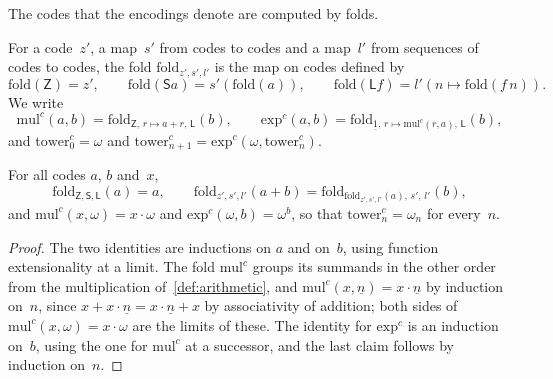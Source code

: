 \documentclass[11pt]{amsart}
\makeatletter
\newcommand{\bZ}{\mathsf{Z}}
\newcommand{\bS}{\mathsf{S}}
\newcommand{\bL}{\mathsf{L}}
\newcommand{\bplus}{\mathbin{+}}
\newcommand{\btimes}{\mathbin{\cdot}}
\newcommand{\num}[1]{\underline{#1}}          %
\newcommand{\tower}[1]{\omega_{#1}}           %
\newif\ifagdarefs
\newcommand{\AgdaRefs}[1]{\ifagdarefs{\footnotesize\color{agdablue}(#1)}\else\unskip\fi}
\newcommand{\Agda}[2]{{\footnotesize\color{agdablue}\textsf{#1}%
  \ifblank{#2}{}{\texttt{.}\allowbreak\texttt{#2}}}}
\let\ttt@plain\texttt
\renewcommand{\texttt}[1]{{\footnotesize\color{agdablue}\ttt@plain{#1}}}
\theoremstyle{plain}
\theoremstyle{definition}
\makeatother
\begin{document}
The codes that the encodings denote are computed by folds.

\begin{definition}
\label{def:fold}
For a code~$z'$, a map~$s'$ from codes to codes and a map~$l'$ from
sequences of codes to codes, the fold
$\mathrm{fold}_{z',s',l'}$ is the map on codes defined by
\[
  \mathrm{fold}(\bZ) = z' , \qquad
  \mathrm{fold}(\bS a) = s'(\mathrm{fold}(a)) , \qquad
  \mathrm{fold}(\bL f) = l'(n \mapsto \mathrm{fold}(f\,n)) .
\]
We write
\[
  \mathrm{mul}^{c}(a, b)
    = \mathrm{fold}_{\bZ,\, r \mapsto a \bplus r,\, \bL}(b) ,
  \qquad
  \mathrm{exp}^{c}(a, b)
    = \mathrm{fold}_{\num 1,\, r \mapsto \mathrm{mul}^{c}(r, a),\,
      \bL}(b) ,
\]
and
$\mathrm{tower}^{c}_0 = \omega$ and
$\mathrm{tower}^{c}_{n+1} = \mathrm{exp}^{c}(\omega,
 \mathrm{tower}^{c}_n)$.
\AgdaRefs{\Agda{DialogueTrees.Sharpness}{fold}; \texttt{mulᶜ},
\texttt{expᶜ}, \texttt{towerᶜ}.}
\end{definition}

\begin{lemma}
\label{lem:fold}
For all codes $a$, $b$ and~$x$,
\[
  \mathrm{fold}_{\bZ,\bS,\bL}(a) = a , \qquad
  \mathrm{fold}_{z',s',l'}(a \bplus b)
    = \mathrm{fold}_{\mathrm{fold}_{z',s',l'}(a),\, s',\, l'}(b) ,
\]
and $\mathrm{mul}^{c}(x, \omega) = x \btimes \omega$ and
$\mathrm{exp}^{c}(\omega, b) = \omega^{b}$, so that
$\mathrm{tower}^{c}_n = \tower n$ for every~$n$.
\AgdaRefs{\Agda{DialogueTrees.Sharpness}{fold-id}; \texttt{fold-⊕},
\texttt{mulᶜ-ι}, \texttt{mulᶜ-ω}, \texttt{expᶜ-ω\^{}},
\texttt{towerᶜ-tower}.}
\end{lemma}

\begin{proof}
The two identities are inductions on $a$ and on~$b$, using function
extensionality at a limit. The fold $\mathrm{mul}^{c}$ groups its
summands in the other order from the multiplication
of~\cref{def:arithmetic}, and
$\mathrm{mul}^{c}(x, \num n) = x \btimes \num n$ by induction on~$n$,
since $x \bplus x \btimes \num n = x \btimes \num n \bplus x$ by
associativity of addition; both sides of
$\mathrm{mul}^{c}(x, \omega) = x \btimes \omega$ are the limits of
these. The identity for $\mathrm{exp}^{c}$ is an induction on~$b$,
using the one for $\mathrm{mul}^{c}$ at a successor, and the last
claim follows by induction on~$n$.
\end{proof}
\end{document}

